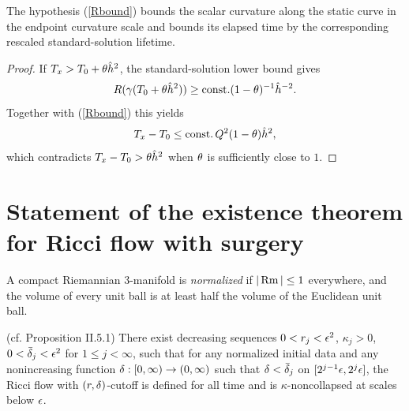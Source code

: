 \begin{remark}
  \label{rem:kl-technical-estimate-estimates-standard-solutions}
The hypothesis (\ref{Rbound}) bounds the scalar curvature along the static
curve in the endpoint curvature scale and bounds its elapsed time by the
corresponding rescaled standard-solution lifetime.
\end{remark}
\begin{proof}
\sketch If $T_x>T_0+\theta\hat h^2$, the standard-solution lower bound gives
\[
R(\gamma(T_0+\theta\hat h^2))\geq\operatorname{const.}(1-\theta)^{-1}\hat h^{-2}.
\]
Together with (\ref{Rbound}) this yields
\[
T_x-T_0\leq\operatorname{const.} Q^2(1-\theta)\hat h^2,
\]
which contradicts $T_x-T_0> \theta\hat h^2$ when $\theta$ is sufficiently close
to $1$.
\end{proof}

\section{Statement of the existence theorem for Ricci flow with surgery}
 \label{II.5}

\begin{definition}
  \label{def:kl-statement-existence-theorem-ricci-flow-surgery-normalized-definition}

A compact Riemannian $3$-manifold is {\em normalized} if
$|\operatorname{Rm}|\leq 1$ everywhere, and the volume of every unit
ball is at least half the volume of the Euclidean unit
ball.
\end{definition}

\begin{proposition}
  \label{prop:kl-statement-existence-theorem-ricci-flow-surgery-monotonicity-kappa-solutions}
(cf. Proposition II.5.1)
\label{surgeryflowexists}
There exist decreasing sequences $0<r_j<\epsilon^2$,
$\kappa_j>0$, $0<\bar{\delta}_j<\epsilon^2$ for $1\leq j<\infty$,
such that for any normalized initial data and any nonincreasing function
$\delta:[0,\infty)\rightarrow(0,\infty)$ such that $\delta<\bar{\delta}_j$
on $[2^{j-1}\epsilon,2^j\epsilon]$, the Ricci flow with $(r,\delta)$-cutoff
is defined for all time and is $\kappa$-noncollapsed
at scales below $\epsilon$.
\end{proposition}

